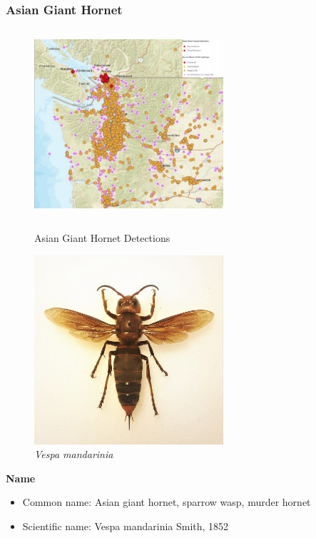 \documentclass[12pt]{article}
\begin{document}
\subsubsection{Asian Giant Hornet  }
\begin{figure}[!htbp]
	\small
	\centering
	\begin{minipage}{8cm}
		\includegraphics[width=7cm,height=7cm]{./pictures/dist0.png}
		\caption{ Asian Giant Hornet Detections\cite{website}}\label{nt}
	\end{minipage}
	\begin{minipage}{8cm}
		\includegraphics[width=7cm,height=7cm]{./pictures/wikiintro.jpg}
		\caption{\emph{Vespa mandarinia}\cite{wiki}}\label{nt}
	\end{minipage}
	
\end{figure}

\textbf{Name}
\begin{itemize}
	\item Common name:  Asian giant hornet, sparrow wasp, murder hornet
	\item Scientific name: Vespa mandarinia Smith, 1852
\end{itemize}
\end{document}
